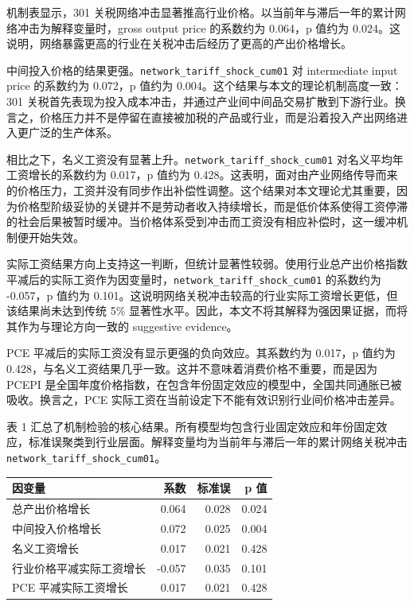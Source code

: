 \documentclass[
]{ctexart}
\newcounter{none} %
\begin{document}
机制表显示，301
关税网络冲击显著推高行业价格。以当前年与滞后一年的累计网络冲击为解释变量时，gross
output price 的系数约为 0.064，p 值约为
0.024。这说明，网络暴露更高的行业在关税冲击后经历了更高的产出价格增长。

中间投入价格的结果更强。\texttt{network\_tariff\_shock\_cum01} 对
intermediate input price 的系数约为 0.072，p 值约为
0.004。这个结果与本文的理论机制高度一致：301
关税首先表现为投入成本冲击，并通过产业间中间品交易扩散到下游行业。换言之，价格压力并不是停留在直接被加税的产品或行业，而是沿着投入产出网络进入更广泛的生产体系。

相比之下，名义工资没有显著上升。\texttt{network\_tariff\_shock\_cum01}
对名义平均年工资增长的系数约为 0.017，p 值约为
0.428。这表明，面对由产业网络传导而来的价格压力，工资并没有同步作出补偿性调整。这个结果对本文理论尤其重要，因为价格型阶级妥协的关键并不是劳动者收入持续增长，而是低价体系使得工资停滞的社会后果被暂时缓冲。当价格体系受到冲击而工资没有相应补偿时，这一缓冲机制便开始失效。

实际工资结果方向上支持这一判断，但统计显著性较弱。使用行业总产出价格指数平减后的实际工资作为因变量时，\texttt{network\_tariff\_shock\_cum01}
的系数约为 -0.057，p 值约为
0.101。这说明网络关税冲击较高的行业实际工资增长更低，但该结果尚未达到传统
5\%
显著性水平。因此，本文不将其解释为强因果证据，而将其作为与理论方向一致的
suggestive evidence。

PCE 平减后的实际工资没有显示更强的负向效应。其系数约为 0.017，p 值约为
0.428，与名义工资结果几乎一致。这并不意味着消费价格不重要，而是因为
PCEPI
是全国年度价格指数，在包含年份固定效应的模型中，全国共同通胀已被吸收。换言之，PCE
实际工资在当前设定下不能有效识别行业间价格冲击差异。

表 1
汇总了机制检验的核心结果。所有模型均包含行业固定效应和年份固定效应，标准误聚类到行业层面。解释变量均为当前年与滞后一年的累计网络关税冲击
\texttt{network\_tariff\_shock\_cum01}。

{\def\LTcaptype{none} %
\begin{longtable}[]{@{}lrrr@{}}
\toprule\noalign{}
因变量 & 系数 & 标准误 & p 值 \\
\midrule\noalign{}
\endhead
\bottomrule\noalign{}
\endlastfoot
总产出价格增长 & 0.064 & 0.028 & 0.024 \\
中间投入价格增长 & 0.072 & 0.025 & 0.004 \\
名义工资增长 & 0.017 & 0.021 & 0.428 \\
行业价格平减实际工资增长 & -0.057 & 0.035 & 0.101 \\
PCE 平减实际工资增长 & 0.017 & 0.021 & 0.428 \\
\end{longtable}
}
\end{document}
